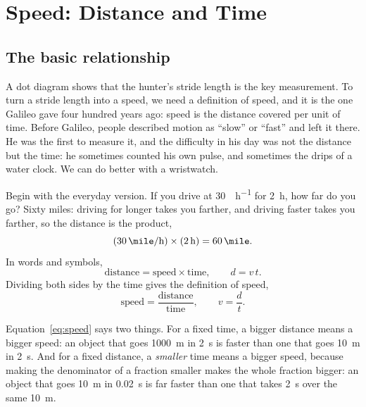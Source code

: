 \documentclass[11pt,twoside,openany]{book}
\begin{document}
\section{Speed: Distance and Time}

\subsection{The basic relationship}

A dot diagram shows that the hunter's stride length is the key measurement. To turn a stride length into a speed, we need a definition of speed, and it is the one Galileo gave four hundred years ago: speed is the distance covered per unit of time. Before Galileo, people described motion as ``slow'' or ``fast'' and left it there. He was the first to measure it, and the difficulty in his day was not the distance but the time: he sometimes counted his own pulse, and sometimes the drips of a water clock. We can do better with a wristwatch.

Begin with the everyday version. If you drive at \SI{30}{\mile\per\hour} for \SI{2}{\hour}, how far do you go? Sixty miles: driving for longer takes you farther, and driving faster takes you farther, so the distance is the product,
\[
(\SI{30}{\mile\per\hour}) \times (\SI{2}{\hour}) = \SI{60}{\mile}.
\]
In words and symbols,
\begin{equation}
\text{distance} = \text{speed} \times \text{time}, \qquad d = v\,t.
\label{eq:dst}
\end{equation}
Dividing both sides by the time gives the definition of speed,
\begin{equation}
\text{speed} = \frac{\text{distance}}{\text{time}}, \qquad v = \frac{d}{t}.
\label{eq:speed}
\end{equation}

Equation~\eqref{eq:speed} says two things. For a fixed time, a bigger distance means a bigger speed: an object that goes \SI{1000}{\metre} in \SI{2}{\second} is faster than one that goes \SI{10}{\metre} in \SI{2}{\second}. And for a fixed distance, a \emph{smaller} time means a bigger speed, because making the denominator of a fraction smaller makes the whole fraction bigger: an object that goes \SI{10}{\metre} in \SI{0.02}{\second} is far faster than one that takes \SI{2}{\second} over the same \SI{10}{\metre}.
\end{document}
